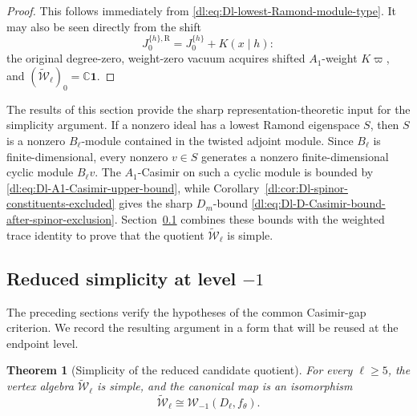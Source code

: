 \documentclass[11pt,reqno]{amsart}
\newtheorem{theorem}{Theorem}[section]
\theoremstyle{definition}
\theoremstyle{remark}
\begin{document}
\begin{proof}
This follows immediately from
\eqref{dl:eq:Dl-lowest-Ramond-module-type}.  It may also be seen directly
from the shift
\begin{equation*}
  J_0^{\{h\},\mathrm R}
  =
  J_0^{\{h\}}+K(x\mid h):
\end{equation*}
the original degree-zero, weight-zero vacuum acquires shifted
\(A_1\)-weight \(K\varpi\), and
\((\widetilde{\mathcal W}_\ell)_0=\mathbb C\mathbf1\).
\end{proof}

The results of this section provide the sharp representation-theoretic
input for the simplicity argument.  If a nonzero ideal has a lowest
Ramond eigenspace \(S\), then \(S\) is a nonzero \(B_\ell\)-module
contained in the twisted adjoint module.  Since \(B_\ell\) is
finite-dimensional, every nonzero \(v\in S\) generates a nonzero
finite-dimensional cyclic module \(B_\ell v\).  The \(A_1\)-Casimir on
such a cyclic module is bounded by
\eqref{dl:eq:Dl-A1-Casimir-upper-bound}, while
Corollary~\ref{dl:cor:Dl-spinor-constituents-excluded} gives the sharp
\(D_m\)-bound
\eqref{dl:eq:Dl-D-Casimir-bound-after-spinor-exclusion}.  Section~\ref{dl:sec:Dl-simplicity-reduced-quotient}
combines these bounds with the weighted trace identity to prove that
the quotient \(\widetilde{\mathcal W}_\ell\) is simple.

\subsection{Reduced simplicity at level \texorpdfstring{$-1$}{-1}}
\label{dl:sec:Dl-simplicity-reduced-quotient}

The preceding sections verify the hypotheses of the common
Casimir-gap criterion.  We record the resulting argument in a form
that will be reused at the endpoint level.

\begin{theorem}[Simplicity of the reduced candidate quotient]
\label{dl:thm:Dl-reduced-candidate-simple}
For every \(\ell\ge5\), the vertex algebra
\(\widetilde{\mathcal W}_\ell\) is simple, and the canonical map is an
isomorphism
\begin{equation*}
 \widetilde{\mathcal W}_\ell
 \cong
 \mathcal W_{-1}(D_\ell,f_\theta).
\end{equation*}
\end{theorem}
\end{document}
